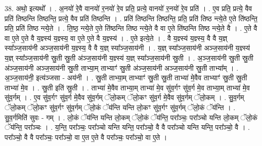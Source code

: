 \documentclass[17pt]{extarticle}
\begin{document}
38. अथो॒ इत्यथो᳚ । . अ॒नयो॑ रे॒वै वानयो॑ र॒नयो॑ रे॒व प्रति॒ प्रत्ये॒ वानयो॑ र॒नयो॑ रे॒व प्रति॑ । . ए॒व प्रति॒ प्रत्ये॒ वैव प्रति॑ तिष्ठन्ति तिष्ठन्ति॒ प्रत्ये॒ वैव प्रति॑ तिष्ठन्ति । . प्रति॑ तिष्ठन्ति तिष्ठन्ति॒ प्रति॒ प्रति॑ तिष्ठ न्त्ये॒ते ए॒ते ति॑ष्ठन्ति॒ प्रति॒ प्रति॑ तिष्ठ न्त्ये॒ते । . ति॒ष्ठ॒ न्त्ये॒ते ए॒ते ति॑ष्ठन्ति तिष्ठ न्त्ये॒ते वै वा ए॒ते ति॑ष्ठन्ति तिष्ठ न्त्ये॒ते वै । . ए॒ते वै वा ए॒ते ए॒ते वै य॒ज्ञ्स्य॑ य॒ज्ञ्स्य॒ वा ए॒ते ए॒ते वै य॒ज्ञ्स्य॑ । . ए॒ते इत्ये॒ते । . वै य॒ज्ञ्स्य॑ य॒ज्ञ्स्य॒ वै वै य॒ज्ञ् स्या᳚ञ्ज॒साय॑नी अञ्ज॒साय॑नी य॒ज्ञ्स्य॒ वै वै य॒ज्ञ् स्या᳚ञ्ज॒साय॑नी । . य॒ज्ञ् स्या᳚ञ्ज॒साय॑नी अञ्ज॒साय॑नी य॒ज्ञ्स्य॑ य॒ज्ञ् स्या᳚ञ्ज॒साय॑नी स्रु॒ती स्रु॒ती अ॑ञ्ज॒साय॑नी य॒ज्ञ्स्य॑ य॒ज्ञ् स्या᳚ञ्ज॒साय॑नी स्रु॒ती । . अ॒ञ्ज॒साय॑नी स्रु॒ती स्रु॒ती अ॑ञ्ज॒साय॑नी अञ्ज॒साय॑नी स्रु॒ती ताभ्या॒म् ताभ्याꣳ॑ स्रु॒ती अ॑ञ्ज॒साय॑नी अञ्ज॒साय॑नी स्रु॒ती ताभ्या᳚म् । . अ॒ञ्ज॒साय॑नी॒ इत्य॑ञ्जसा - अय॑नी । . स्रु॒ती ताभ्या॒म् ताभ्याꣳ॑ स्रु॒ती स्रु॒ती ताभ्या॑ मे॒वैव ताभ्याꣳ॑ स्रु॒ती स्रु॒ती ताभ्या॑ मे॒व । . स्रु॒ती इति॑ स्रु॒ती । . ताभ्या॑ मे॒वैव ताभ्या॒म् ताभ्या॑ मे॒व सु॑व॒र्गꣳ सु॑व॒र्ग मे॒व ताभ्या॒म् ताभ्या॑ मे॒व सु॑व॒र्गम् । . ए॒व सु॑व॒र्गꣳ सु॑व॒र्ग मे॒वैव सु॑व॒र्गम् ॅलो॒कम् ॅलो॒कꣳ सु॑व॒र्ग मे॒वैव सु॑व॒र्गम् ॅलो॒कम् । . सु॒व॒र्गम् ॅलो॒कम् ॅलो॒कꣳ सु॑व॒र्गꣳ सु॑व॒र्गम् ॅलो॒कं ॅय॑न्ति यन्ति लो॒कꣳ सु॑व॒र्गꣳ सु॑व॒र्गम् ॅलो॒कं ॅय॑न्ति । . सु॒व॒र्गमिति॑ सुवः - गम् । . लो॒कं ॅय॑न्ति यन्ति लो॒कम् ॅलो॒कं ॅय॑न्ति॒ परा᳚ञ्चः॒ परा᳚ञ्चो यन्ति लो॒कम् ॅलो॒कं ॅय॑न्ति॒ परा᳚ञ्चः । . य॒न्ति॒ परा᳚ञ्चः॒ परा᳚ञ्चो यन्ति यन्ति॒ परा᳚ञ्चो॒ वै वै परा᳚ञ्चो यन्ति यन्ति॒ परा᳚ञ्चो॒ वै । . परा᳚ञ्चो॒ वै वै परा᳚ञ्चः॒ परा᳚ञ्चो॒ वा ए॒त ए॒ते वै परा᳚ञ्चः॒ परा᳚ञ्चो॒ वा ए॒ते । \newline
\end{document}
